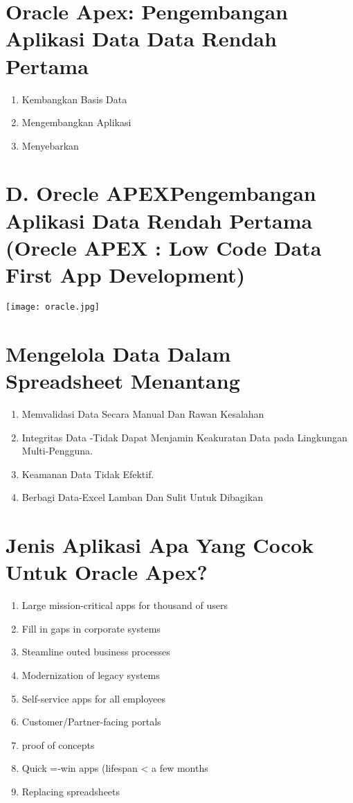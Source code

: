 \documentclass{article}
\begin{document}
\section{Oracle Apex: Pengembangan Aplikasi Data Data Rendah Pertama}
\begin{enumerate}
    \item Kembangkan Basis Data
    \item Mengembangkan Aplikasi
    \item Menyebarkan
\end{enumerate}
    
\section{D.	Orecle APEXPengembangan Aplikasi Data Rendah Pertama
(Orecle APEX : Low Code Data First App Development)}

\begin{center}
    \texttt{[image: oracle.jpg]}
\end{center}

\section{Mengelola Data Dalam Spreadsheet Menantang}
\begin{enumerate}
    \item Memvalidasi Data Secara Manual Dan Rawan Kesalahan
    \item Integritas Data -Tidak Dapat Menjamin Keakuratan Data pada Lingkungan Multi-Pengguna.
    \item Keamanan Data Tidak Efektif.
    \item Berbagi Data-Excel Lamban Dan Sulit Untuk Dibagikan
    \end{enumerate}
    
\section{Jenis Aplikasi Apa Yang Cocok Untuk Oracle Apex?}
\begin{enumerate}
    \item Large mission-critical apps for thousand of users
    \item Fill in gaps in corporate systems
    \item Steamline outed business processes
    \item Modernization of legacy systems
    \item Self-service apps for all employees
    \item Customer/Partner-facing portals
    \item proof of concepts
    \item Quick =-win apps (lifespan < a few months
    \item Replacing spreadsheets
\end{enumerate}
\end{document}

